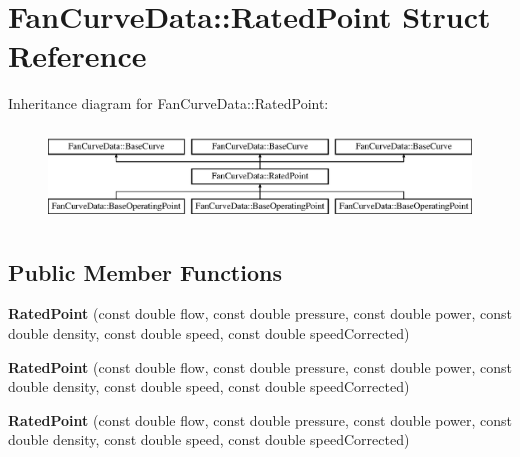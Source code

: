 \hypertarget{struct_fan_curve_data_1_1_rated_point}{}\section{Fan\+Curve\+Data\+:\+:Rated\+Point Struct Reference}
\label{struct_fan_curve_data_1_1_rated_point}
Inheritance diagram for Fan\+Curve\+Data\+:\+:Rated\+Point\+:\begin{figure}[H]
\begin{center}
\leavevmode
\includegraphics[height=2.533937cm]{d2/da5/struct_fan_curve_data_1_1_rated_point}
\end{center}
\end{figure}
\subsection*{Public Member Functions}
\begin{DoxyCompactItemize}
\item 
\mbox{\label{struct_fan_curve_data_1_1_rated_point_a023280b292b8e407d81c433848189f05}} 
{\bfseries Rated\+Point} (const double flow, const double pressure, const double power, const double density, const double speed, const double speed\+Corrected)
\item 
\mbox{\label{struct_fan_curve_data_1_1_rated_point_a023280b292b8e407d81c433848189f05}} 
{\bfseries Rated\+Point} (const double flow, const double pressure, const double power, const double density, const double speed, const double speed\+Corrected)
\item 
\mbox{\label{struct_fan_curve_data_1_1_rated_point_a023280b292b8e407d81c433848189f05}} 
{\bfseries Rated\+Point} (const double flow, const double pressure, const double power, const double density, const double speed, const double speed\+Corrected)
\end{DoxyCompactItemize}
